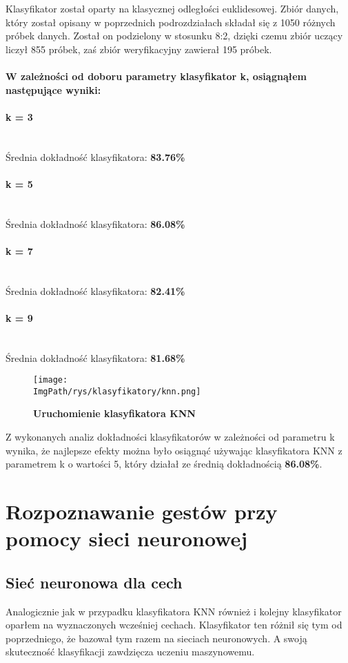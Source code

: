 \documentclass[a4paper,12pt,twoside,openany]{report}
\newcommand{\ImgPath}{.}
\begin{document}
Klasyfikator został oparty na klasycznej odległości euklidesowej. Zbiór danych, który został opisany w poprzednich podrozdziałach składał się z 1050 różnych próbek danych. Został on podzielony w stosunku 8:2, dzięki czemu zbiór uczący liczył 855 próbek, zaś zbiór weryfikacyjny zawierał 195 próbek. 

\paragraph{W zależności od doboru parametry klasyfikator k, osiągnąłem następujące wyniki:}
{\centering
\paragraph{k = 3}
	\mbox{}\\
	Średnia dokładność klasyfikatora: \textbf{83.76\%}
\paragraph{k = 5}
	\mbox{}\\
	Średnia dokładność klasyfikatora: \textbf{86.08\%}
\paragraph{k = 7}
	\mbox{}\\
	Średnia dokładność klasyfikatora: \textbf{82.41\%}
\paragraph{k = 9}
	\mbox{}\\
	Średnia dokładność klasyfikatora: \textbf{81.68\%} \par
}
	\begin{figure}[H]
		\centering
		{\label{fig:b}\texttt{[image: \\ImgPath/rys/klasyfikatory/knn.png]}}
		\caption{  \textbf{Uruchomienie klasyfikatora KNN}}
	\end{figure}
	
Z wykonanych analiz dokładności klasyfikatorów w zależności od parametru k wynika, że najlepsze efekty można było osiągnąć używając klasyfikatora KNN z parametrem k o wartości 5, który działał ze średnią dokładnością \textbf{86.08\%}.
\section{Rozpoznawanie gestów przy pomocy sieci neuronowej}
\subsection{Sieć neuronowa dla cech}
	Analogicznie jak w przypadku klasyfikatora KNN również i  kolejny klasyfikator oparłem na wyznaczonych wcześniej cechach. Klasyfikator ten różnił się tym od poprzedniego, że bazował tym razem na sieciach neuronowych. A swoją skuteczność klasyfikacji zawdzięcza uczeniu maszynowemu.
	
\end{document}
